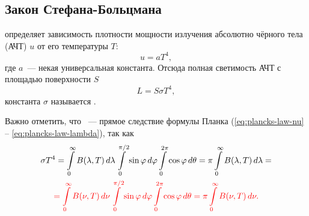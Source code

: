 \subsection{Закон Стефана-Больцмана}
 определяет зависимость плотности мощности излучения абсолютно чёрного тела (АЧТ) $u$ от его температуры $T$:
\begin{equation}
u = a T^4,
\end{equation} 
где $a$~--- некая универсальная константа.
Отсюда полная светимость АЧТ с площадью поверхности $S$
	\begin{equation}
	L = S \sigma T^4,
	\label{eq:steff-bol-law}
\end{equation}
константа $\sigma$ называется .
  
Важно отметить, что ~--- прямое следствие формулы Планка (\ref{eq:plancks-law-nu} -- \ref{eq:plancks-law-lambda}), так как
\begin{multline}
	\sigma T^4 = \int\limits^\infty_0 B(\lambda, T)\,d\lambda \int\limits_0^{\pi/2} \sin \varphi\, d\varphi \int\limits_0^{2\pi} \cos \varphi\, d\theta = \pi \int\limits^\infty_0 B(\lambda, T)\,d\lambda =\\
		 \textcolor{red}{= \int\limits^\infty_0 B(\nu, T)\,d\nu \int\limits_0^{\pi/2} \sin \varphi\, d\varphi \int\limits_0^{2\pi} \cos \varphi\, d\theta = \pi \int\limits^\infty_0 B(\nu, T)\,d\nu.}
\end{multline}

